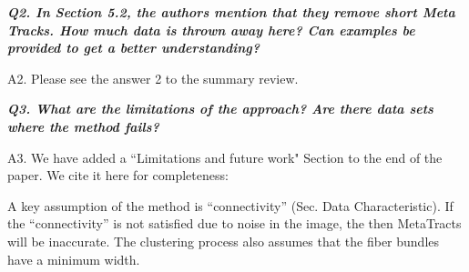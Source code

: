 \documentclass[]{article}
\begin{document}
\makebox[\linewidth]{\rule{0.25\textwidth}{0.4pt}}


\textbf{\textit{
Q2. In Section 5.2, the authors mention that they remove short Meta Tracks.
How much data is thrown away here? Can examples be provided to get a
better understanding?
}}


A2. Please see the answer 2 to the summary review.

\makebox[\linewidth]{\rule{0.25\textwidth}{0.4pt}}


\textbf{\textit{
Q3. What are the limitations of the approach? Are there data sets where the
method fails?
}
}

A3. We have added a ``Limitations and future work" Section to the end of the paper. We cite it here for completeness:

A key assumption of the method is ``connectivity'' (Sec. Data Characteristic).
If the ``connectivity'' is not satisfied due to noise in the image, the then MetaTracts will be inaccurate. 
The clustering process also assumes that the fiber bundles have a minimum width. 


\end{document}
